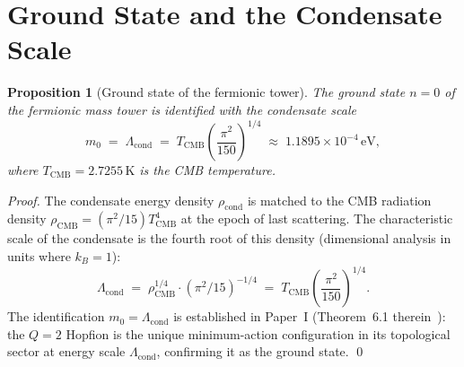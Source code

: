 \documentclass[11pt,a4paper]{article}
\newtheorem{proposition}[theorem]{Proposition}
\theoremstyle{definition}
\theoremstyle{remark}
\newcommand{\TCMB}{T_{\mathrm{CMB}}}
\newcommand{\Lcond}{\Lambda_{\mathrm{cond}}}
\begin{document}
\section{Ground State and the Condensate Scale}
\label{P6:sec:quantisation}

\begin{proposition}[Ground state of the fermionic tower]
\label{P6:prop:ground_state}
The ground state $n=0$ of the fermionic mass tower is identified with
the condensate scale
\begin{equation}
  m_0 \;=\; \Lcond \;=\; \TCMB\!\left(\frac{\pi^2}{150}\right)^{\!1/4}
  \;\approx\; 1.1895\times10^{-4}\,\mathrm{eV},
  \label{P6:eq:ground_state}
\end{equation}
where $\TCMB = 2.7255\,\mathrm{K}$ is the CMB temperature.
\end{proposition}

\begin{proof}
The condensate energy density $\rho_{\mathrm{cond}}$ is matched to
the CMB radiation density $\rho_{\mathrm{CMB}} = (\pi^2/15)T_{\mathrm{CMB}}^4$
at the epoch of last scattering.  The characteristic scale of the
condensate is the fourth root of this density (dimensional analysis in
units where $k_B = 1$):
\[
  \Lcond \;=\; \rho_{\mathrm{CMB}}^{1/4} \cdot (\pi^2/15)^{-1/4}
  \;=\; \TCMB\!\left(\frac{\pi^2}{150}\right)^{\!1/4}.
\]
The identification $m_0 = \Lcond$ is established in Paper~I
(Theorem~6.1 therein~\cite{Paper1}): the $Q=2$ Hopfion is the unique
minimum-action configuration in its topological sector at energy scale
$\Lcond$, confirming it as the ground state.
\qed
\end{proof}
\end{document}
